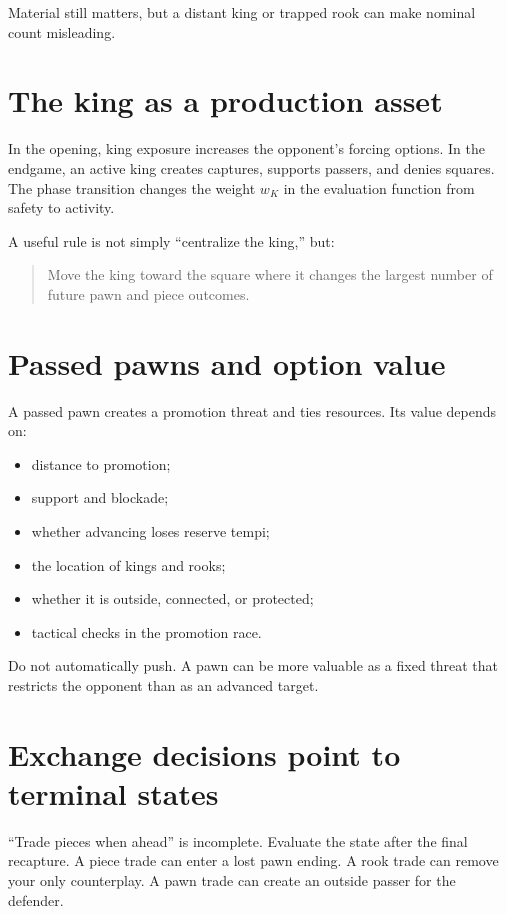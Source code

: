 Material still matters, but a distant king or trapped rook can make nominal count misleading.

\section{The king as a production asset}
In the opening, king exposure increases the opponent's forcing options. In the endgame, an active king creates captures, supports passers, and denies squares. The phase transition changes the weight $w_K$ in the evaluation function from safety to activity.

A useful rule is not simply ``centralize the king,'' but:

\begin{quote}
Move the king toward the square where it changes the largest number of future pawn and piece outcomes.
\end{quote}

\section{Passed pawns and option value}
A passed pawn creates a promotion threat and ties resources. Its value depends on:

\begin{itemize}[leftmargin=1.4em]
\item distance to promotion;
\item support and blockade;
\item whether advancing loses reserve tempi;
\item the location of kings and rooks;
\item whether it is outside, connected, or protected;
\item tactical checks in the promotion race.
\end{itemize}

Do not automatically push. A pawn can be more valuable as a fixed threat that restricts the opponent than as an advanced target.

\section{Exchange decisions point to terminal states}
``Trade pieces when ahead'' is incomplete. Evaluate the state after the final recapture. A piece trade can enter a lost pawn ending. A rook trade can remove your only counterplay. A pawn trade can create an outside passer for the defender.

